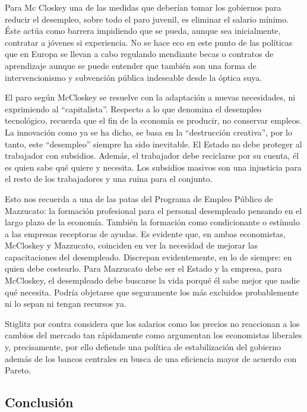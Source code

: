 \documentclass[
]{article}
\begin{document}
Para Mc Closkey una de las medidas que deberían tomar los gobiernos para
reducir el desempleo, sobre todo el paro juvenil, es eliminar el salario
mínimo. Éste actúa como barrera impidiendo que se pueda, aunque sea
inicialmente, contratar a jóvenes si experiencia. No se hace eco en este
punto de las políticas que en Europa se llevan a cabo regulando
mendiante becas o contratos de aprendizaje aunque se puede entender que
también son una forma de intervencionismo y subvención pública
indeseable desde la óptica suya.

El paro según McCloskey se resuelve con la adaptación a nuevas
necesidades, ni exprimiendo al ``capitalista''. Respecto a lo que
denomina el desempleo tecnológico, recuerda que el fin de la economía es
producir, no conservar empleos. La innovación como ya se ha dicho, se
basa en la ``destrucción creativa'', por lo tanto, este ``desempleo''
siempre ha sido inevitable. El Estado no debe proteger al trabajador con
subsidios. Además, el trabajador debe reciclarse por su cuenta, él es
quien sabe qué quiere y necesita. Los subsidios masivos son una
injusticia para el resto de los trabajadores y una ruina para el
conjunto.

Esto nos recuerda a una de las patas del Programa de Empleo Público de
Mazzucato: la formación profesional para el personal desempleado
pensando en el largo plazo de la economía. También la formación como
condicionante o estímulo a las empresas receptoras de ayudas. Es
evidente que, en ambas economistas, McCloskey y Mazzucato, coinciden en
ver la necesidad de mejorar las capacitaciones del desempleado.
Discrepan evidentemente, en lo de siempre: en quien debe costearlo. Para
Mazzucato debe ser el Estado y la empresa, para McCloskey, el
desempleado debe buscarse la vida porqué él sabe mejor que nadie qué
necesita. Podría objetarse que seguramente los más excluidos
probablemente ni lo sepan ni tengan recursos ya.

Stiglitz por contra considera que los salarios como los precios no
reaccionan a los cambios del mercado tan rápidamente como argumentan los
economistas liberales y, precisamente, por ello defiende una política de
estabilización del gobierno además de los bancos centrales en busca de
una eficiencia mayor de acuerdo con Pareto.

\hypertarget{conclusiuxf3n-2}{%
\subsection{Conclusión}\label{conclusiuxf3n-2}}
\end{document}
